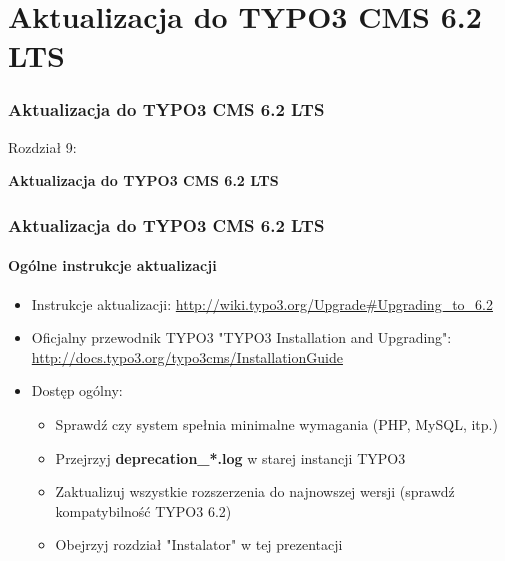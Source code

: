 %
\section{Aktualizacja do TYPO3 CMS 6.2 LTS}
\begin{frame}[fragile]
	\frametitle{Aktualizacja do TYPO3 CMS 6.2 LTS}

	\begin{center}\huge{Rozdział 9:}\end{center}
	\begin{center}\huge{\color{typo3darkgrey}\textbf{Aktualizacja do TYPO3 CMS 6.2 LTS}}\end{center}

\end{frame}


\begin{frame}[fragile]
	\frametitle{Aktualizacja do TYPO3 CMS 6.2 LTS}
	\framesubtitle{Ogólne instrukcje aktualizacji}

	\begin{itemize}

		\item Instrukcje aktualizacji:\newline
			\smaller\url{http://wiki.typo3.org/Upgrade#Upgrading_to_6.2}\normalsize
		\item Oficjalny przewodnik TYPO3 "TYPO3 Installation and Upgrading":
			\smaller\url{http://docs.typo3.org/typo3cms/InstallationGuide}\normalsize
		\item Dostęp ogólny:
			\begin{itemize}
				\item Sprawdź czy system spełnia minimalne wymagania \small(PHP, MySQL, itp.)\normalsize
				\item Przejrzyj \textbf{deprecation\_*.log} w starej instancji TYPO3
				\item Zaktualizuj wszystkie rozszerzenia do najnowszej wersji\newline
					\small(sprawdź kompatybilność TYPO3 6.2)\normalsize
				\item Obejrzyj rozdział "Instalator" w tej prezentacji
			\end{itemize}
	\end{itemize}

\end{frame}

